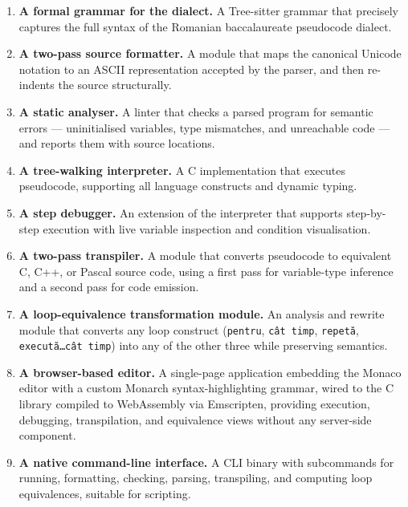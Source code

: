 \begin{enumerate}
  \item \textbf{A formal grammar for the dialect.}
        A Tree-sitter grammar that precisely captures the full syntax of the
        Romanian baccalaureate pseudocode dialect.

  \item \textbf{A two-pass source formatter.}
        A module that maps the canonical Unicode notation to an ASCII
        representation accepted by the parser, and then re-indents the
        source structurally.

  \item \textbf{A static analyser.}
        A linter that checks a parsed program for semantic errors ---
        uninitialised variables, type mismatches, and unreachable code ---
        and reports them with source locations.

  \item \textbf{A tree-walking interpreter.}
        A C implementation that executes pseudocode, supporting all language
        constructs and dynamic typing.

  \item \textbf{A step debugger.}
        An extension of the interpreter that supports step-by-step execution
        with live variable inspection and condition visualisation.

  \item \textbf{A two-pass transpiler.}
        A module that converts pseudocode to equivalent C, C++, or Pascal
        source code, using a first pass for variable-type inference and a
        second pass for code emission.

  \item \textbf{A loop-equivalence transformation module.}
        An analysis and rewrite module that converts any loop construct
        (\texttt{pentru}, \texttt{cât timp}, \texttt{repetă},
        \texttt{execută\ldots cât timp}) into any of the other three while
        preserving semantics.

  \item \textbf{A browser-based editor.}
        A single-page application embedding the Monaco editor with a custom
        Monarch syntax-highlighting grammar, wired to the C library compiled
        to WebAssembly via Emscripten, providing execution, debugging,
        transpilation, and equivalence views without any server-side
        component.

  \item \textbf{A native command-line interface.}
        A CLI binary with subcommands for running, formatting, checking,
        parsing, transpiling, and computing loop equivalences, suitable for
        scripting.
\end{enumerate}

